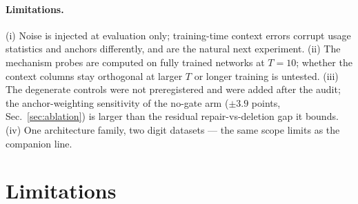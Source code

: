 \documentclass[review,12pt,number]{elsarticle}
\begin{document}
\paragraph{Limitations.} (i) Noise is injected at evaluation only;
training-time context errors corrupt usage statistics and anchors
differently, and are the natural next experiment. (ii) The mechanism
probes are computed on fully trained networks at $T{=}10$; whether the
context columns stay orthogonal at larger $T$ or longer training is
untested. (iii) The degenerate controls were not preregistered and were
added after the audit; the anchor-weighting sensitivity of the no-gate
arm ($\pm 3.9$ points, Sec.~\ref{sec:ablation}) is larger than the
residual repair-vs-deletion gap it bounds. (iv) One architecture
family, two digit datasets --- the same scope limits as the companion
line.



\section{Limitations}
\label{sec:limitations}
\end{document}

